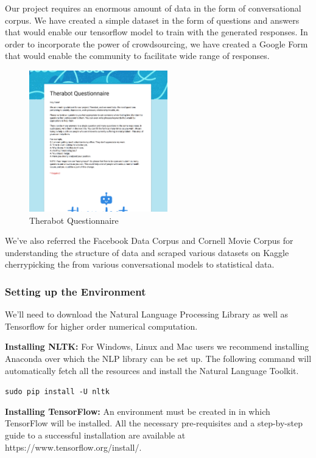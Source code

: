 \documentclass[conference,compsoc]{IEEEtran}
\begin{document}
Our project requires an enormous amount of data in the form of conversational corpus. We have created a simple dataset in the form of questions and answers that would enable our tensorflow model to train with the generated responses. In order to incorporate the power of crowdsourcing, we have created a Google Form that would enable the community to facilitate wide range of responses.

\begin{figure}[H]
    \centering
    \includegraphics[width=6cm]{images/therabot-questionnaire.png}
    \caption{Therabot Questionnaire}
\end{figure}

We’ve also referred the Facebook Data Corpus and Cornell Movie Corpus for understanding the structure of data and scraped various datasets on Kaggle cherrypicking the from various conversational models to statistical data.

\subsubsection{Setting up the Environment}

We’ll need to download the Natural Language Processing Library as well as Tensorflow for higher order numerical computation.

\textbf{Installing NLTK:}
For Windows, Linux and Mac users we recommend installing Anaconda over which the NLP library can be set up. The following command will automatically fetch all the resources and install the Natural Language Toolkit.


\texttt{sudo pip install -U nltk}

\textbf{Installing TensorFlow:}
An environment must be created in in which TensorFlow will be installed. All the necessary pre-requisites and a step-by-step guide to a successful installation are available at https://www.tensorflow.org/install/.
\end{document}
